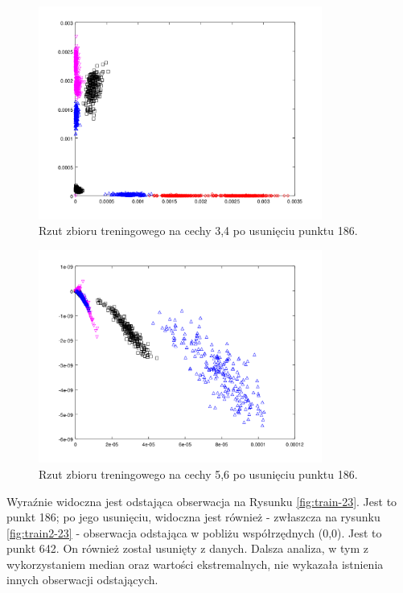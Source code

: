 \documentclass{article}
\begin{document}
	\begin{figure} \centering 
		\includegraphics[height = 7cm]{plot-train2-3-4.png}
		\caption{Rzut zbioru treningowego na cechy 3,4 po usunięciu punktu 186. }
		\label{fig:train2:34}
	\end{figure}
	\begin{figure} \centering 
		\includegraphics[height = 7cm]{plot-train2-5-6.png}
		\caption{Rzut zbioru treningowego na cechy 5,6 po usunięciu punktu 186.  }
		\label{fig:train2-56}
	\end{figure}
	Wyraźnie widoczna jest odstająca obserwacja na Rysunku \ref{fig:train-23}. Jest to punkt 186; po jego usunięciu, widoczna jest również - zwłaszcza na rysunku \ref{fig:train2-23} - obserwacja odstająca w pobliżu współrzędnych (0,0). Jest to punkt 642. On również został usunięty z danych. Dalsza analiza, w tym z wykorzystaniem median oraz wartości ekstremalnych, nie wykazała istnienia innych obserwacji odstających. 
	
\end{document}
